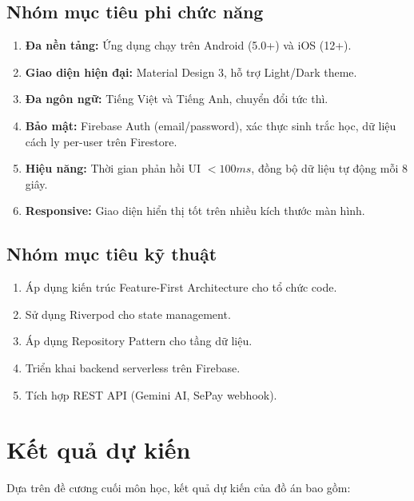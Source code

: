 \subsection{Nhóm mục tiêu phi chức năng}

\begin{enumerate}
  \item \textbf{Đa nền tảng:} Ứng dụng chạy trên Android (5.0+) và iOS (12+).
  \item \textbf{Giao diện hiện đại:} Material Design 3, hỗ trợ Light/Dark theme.
  \item \textbf{Đa ngôn ngữ:} Tiếng Việt và Tiếng Anh, chuyển đổi tức thì.
  \item \textbf{Bảo mật:} Firebase Auth (email/password), xác thực sinh trắc học, dữ liệu cách ly per-user trên Firestore.
  \item \textbf{Hiệu năng:} Thời gian phản hồi UI $< 100ms$, đồng bộ dữ liệu tự động mỗi 8 giây.
  \item \textbf{Responsive:} Giao diện hiển thị tốt trên nhiều kích thước màn hình.
\end{enumerate}

\subsection{Nhóm mục tiêu kỹ thuật}

\begin{enumerate}
  \item Áp dụng kiến trúc Feature-First Architecture cho tổ chức code.
  \item Sử dụng Riverpod cho state management.
  \item Áp dụng Repository Pattern cho tầng dữ liệu.
  \item Triển khai backend serverless trên Firebase.
  \item Tích hợp REST API (Gemini AI, SePay webhook).
\end{enumerate}


\section{Kết quả dự kiến}

Dựa trên đề cương cuối môn học, kết quả dự kiến của đồ án bao gồm:

